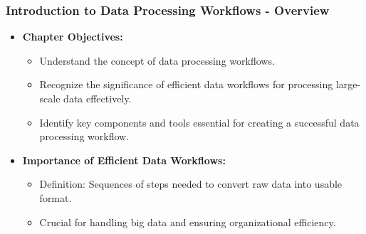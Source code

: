 \documentclass[aspectratio=169]{beamer}
\begin{document}
\frame{\titlepage}

\begin{frame}[fragile]
    \frametitle{Introduction to Data Processing Workflows - Overview}
    \begin{itemize}
        \item \textbf{Chapter Objectives:}
        \begin{itemize}
            \item Understand the concept of data processing workflows.
            \item Recognize the significance of efficient data workflows for processing large-scale data effectively.
            \item Identify key components and tools essential for creating a successful data processing workflow.
        \end{itemize}
        
        \item \textbf{Importance of Efficient Data Workflows:}
        \begin{itemize}
            \item Definition: Sequences of steps needed to convert raw data into usable format.
            \item Crucial for handling big data and ensuring organizational efficiency.
        \end{itemize}
    \end{itemize}
\end{frame}
\end{document}
